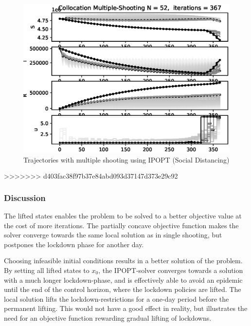 \begin{figure}[H]
    \centering
    \includegraphics[width=.8\textwidth]{pythonProject/Figures/Collocation_Trajectory_Social_Distancing.eps}
    \caption{Trajectories with multiple shooting using IPOPT (Social Distancing)}
    \label{fig:MS_Traj_SD_IPOPT}
\end{figure}

>>>>>>> d403fac38f97b37e84abd093d37147d373e29c92
\subsubsection{Discussion}
The lifted states enables the problem to be solved to a better objective value at the cost of more iterations. The partially concave objective function makes the solver converge towards the same local solution as in single shooting, but postpones the lockdown phase for another day.

Choosing infeasible initial conditions results in a better solution of the problem. By setting all lifted states to $x_0$, the IPOPT-solver converges towards a solution with a much longer lockdown-phase, and is effectively able to avoid an epidemic until the end of the control horizon, where the lockdown policies are lifted. The local solution lifts the lockdown-restrictions for a one-day period before the permanent lifting. This would not have a good effect in reality, but illustrates the need for an objective function rewarding gradual lifting of lockdowns. 



